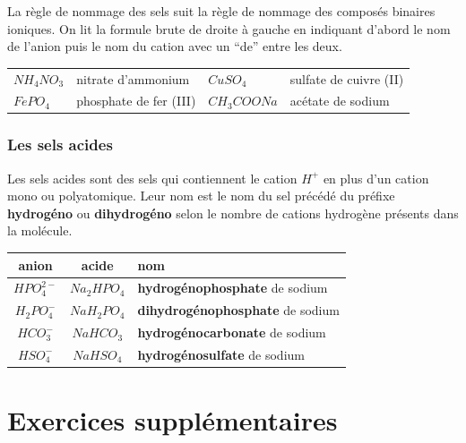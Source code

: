 \documentclass[
  11pt,
  a4paper,
  openany]{book}
\begin{document}
La règle de nommage des sels suit la règle de nommage des composés binaires ioniques. On lit la formule brute de droite à gauche en indiquant d'abord le nom de l'anion puis le nom du cation avec un ``de'' entre les deux.

\begin{longtable}[]{@{}
  >{\centering\arraybackslash}p{}
  >{\raggedright\arraybackslash}p{}
  >{\centering\arraybackslash}p{}
  >{\raggedright\arraybackslash}p{}@{}}
\toprule\noalign{}
\endhead
\bottomrule\noalign{}
\endlastfoot
\(NH_4NO_3\) & nitrate d'ammonium & \(CuSO_4\) & sulfate de cuivre (II) \\
\(FePO_4\) & phosphate de fer (III) & \(CH_3COONa\) & acétate de sodium \\
\end{longtable}

\subsubsection{Les sels acides}\label{les-sels-acides}

Les sels acides sont des sels qui contiennent le cation \(H^+\) en plus d'un cation mono ou polyatomique. Leur nom est le nom du sel précédé du préfixe \textbf{hydrogéno} ou \textbf{dihydrogéno} selon le nombre de cations hydrogène présents dans la molécule.

\begin{longtable}[]{@{}ccl@{}}
\toprule\noalign{}
anion & acide & nom \\
\midrule\noalign{}
\endhead
\bottomrule\noalign{}
\endlastfoot
\(HPO_4^{2-}\) & \(Na_2HPO_4\) & \textbf{hydrogénophosphate} de sodium \\
\(H_2PO_4^-\) & \(NaH_2PO_4\) & \textbf{dihydrogénophosphate} de sodium \\
\(HCO_3^-\) & \(NaHCO_3\) & \textbf{hydrogénocarbonate} de sodium \\
\(HSO_4^-\) & \(NaHSO_4\) & \textbf{hydrogénosulfate} de sodium \\
\end{longtable}

\section{Exercices supplémentaires}\label{exercices-suppluxe9mentaires-6}
\end{document}
